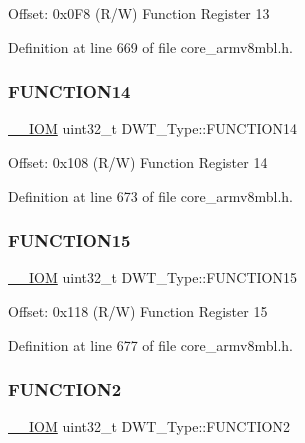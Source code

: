Offset\+: 0x0\+F8 (R/W) Function Register 13 

Definition at line 669 of file core\+\_\+armv8mbl.\+h.

\mbox{\label{struct_d_w_t___type_a85138a411459f923ea8e05312d70af71}} 
\subsubsection{\texorpdfstring{F\+U\+N\+C\+T\+I\+O\+N14}{FUNCTION14}}
{\footnotesize\ttfamily \hyperlink{core__sc300_8h_ab6caba5853a60a17e8e04499b52bf691}{\+\_\+\+\_\+\+I\+OM} uint32\+\_\+t D\+W\+T\+\_\+\+Type\+::\+F\+U\+N\+C\+T\+I\+O\+N14}

Offset\+: 0x108 (R/W) Function Register 14 

Definition at line 673 of file core\+\_\+armv8mbl.\+h.

\mbox{\label{struct_d_w_t___type_a6e5fda09de44dfcd3e177c16028ceb74}} 
\subsubsection{\texorpdfstring{F\+U\+N\+C\+T\+I\+O\+N15}{FUNCTION15}}
{\footnotesize\ttfamily \hyperlink{core__sc300_8h_ab6caba5853a60a17e8e04499b52bf691}{\+\_\+\+\_\+\+I\+OM} uint32\+\_\+t D\+W\+T\+\_\+\+Type\+::\+F\+U\+N\+C\+T\+I\+O\+N15}

Offset\+: 0x118 (R/W) Function Register 15 

Definition at line 677 of file core\+\_\+armv8mbl.\+h.

\mbox{\label{struct_d_w_t___type_ab1b60d6600c38abae515bab8e86a188f}} 
\subsubsection{\texorpdfstring{F\+U\+N\+C\+T\+I\+O\+N2}{FUNCTION2}}
{\footnotesize\ttfamily \hyperlink{core__sc300_8h_ab6caba5853a60a17e8e04499b52bf691}{\+\_\+\+\_\+\+I\+OM} uint32\+\_\+t D\+W\+T\+\_\+\+Type\+::\+F\+U\+N\+C\+T\+I\+O\+N2}


